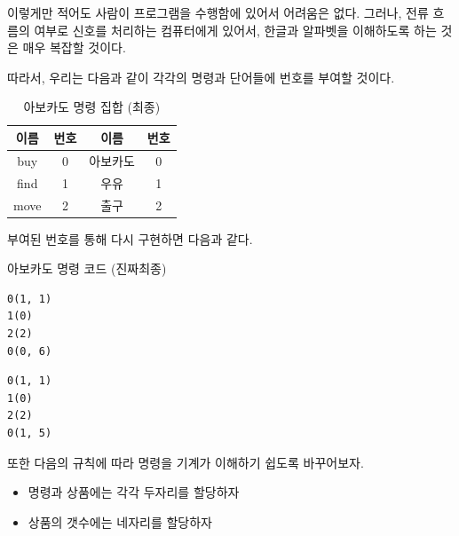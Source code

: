 \documentclass[a4paper,12pt]{book}
\newcommand*{\fullref}[1]{\autoref{#1} (\nameref*{#1})}
\begin{document}
이렇게만 적어도 사람이 프로그램을 수행함에 있어서 어려움은 없다.
그러나, 전류 흐름의 여부로 신호를 처리하는 컴퓨터에게 있어서,
한글과 알파벳을 이해하도록 하는 것은 매우 복잡할 것이다.

따라서, 우리는 다음과 같이 각각의 명령과 단어들에 번호를 부여할 것이다.

\begin{table}[!h]
    \centering

    \caption{아보카도 명령 집합 (최종)}
    \label{Tab:avocado-isa-int}

    \begin{tabular}{ || c | c | c | c || }
        \hline
        이름 & 번호 & 이름     & 번호 \\
        \hline\hline
        buy  & 0    & 아보카도 & 0    \\
        \hline
        find & 1    & 우유     & 1    \\
        \hline
        move & 2    & 출구     & 2    \\
        \hline
    \end{tabular}
\end{table}

부여된 번호를 통해 다시 구현하면 다음과 같다.

\begin{center}

    \centering

    아보카도 명령 코드 (진짜최종)

    \begin{minipage}{0.45\textwidth}
        \begin{lstlisting}
0(1, 1)
1(0)
2(2)
0(0, 6)
        \end{lstlisting}
    \end{minipage}
    \hfill
    \begin{minipage}{0.45\textwidth}
        \begin{lstlisting}
0(1, 1)
1(0)
2(2)
0(1, 5)
        \end{lstlisting}
    \end{minipage}

\end{center}

또한 다음의 규칙에 따라 명령을 기계가 이해하기 쉽도록 바꾸어보자.

\begin{itemize}
    \item 명령과 상품에는 각각 두자리를 할당하자
    \item 상품의 갯수에는 네자리를 할당하자
\end{itemize}
\end{document}
